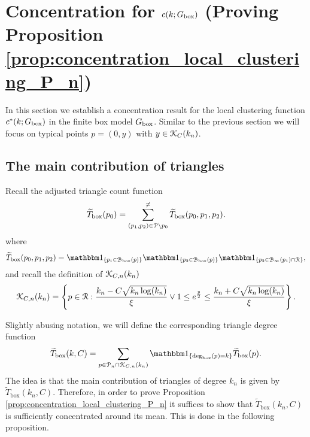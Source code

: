 \section{Concentration for $c(k; G_{\text{box}})$ (Proving Proposition \ref{prop:concentration_local_clustering_P_n})}
\label{sec:concentration_c_P_n}

In this section we establish a concentration result for the local clustering function $c^\ast(k; G_{\text{box}})$ in the finite box model $G_{\text{box}}$. Similar to the previous section we will focus on typical points $p = (0,y)$ with $y \in {\mathcal K}_{C}(k_n)$.

\subsection{The main contribution of triangles}

Recall the adjusted triangle count function
\[
	\widetilde{T}_{\text{box}}(p_0) = \sum_{(p_1, p_2) \in {\mathcal P} \setminus p_0}^{\ne} 
		\widetilde{T}_{\text{box}}(p_0,p_1,p_2).
\]
where
\[
	\widetilde{T}_{\text{box}}(p_0,p_1,p_2) = \ind{p_1 \in \BallPon{p}}\ind{p_2 \in \BallPon{p}}\ind{p_2 \in \BallPo{p_1} \cap \Rcal},
\]
and recall the definition of ${\mathcal K}_{C,n}(k_n)$
\[
	{\mathcal K}_{C,n}(k_n) = \left\{p \in {\mathcal R} : \frac{k_n - C \sqrt{k_n \log(k_n)}}{\xi} \vee 1 \le e^{\frac{y}{2}}
		\le \frac{k_n + C \sqrt{k_n \log(k_n)}}{\xi} \right\}.
\]



Slightly abusing notation, we will define the corresponding triangle degree function
\begin{equation}\label{eq:def_degree_triangle_count_in_K}
	\widetilde{T}_{\text{box}}(k, C) = \sum_{p \in \Pcal_n \cap \Kcal_{C,n}(k_n)} \ind{\text{deg}_{\text{box}}(p) = k} \widetilde{T}_{\text{box}}(p).
\end{equation}
The idea is that the main contribution of triangles of degree $k_n$ is given by $\widetilde{T}_{\text{box}}(k_n, C)$. Therefore, in order to prove Proposition \ref{prop:concentration_local_clustering_P_n} it suffices to show that $\widetilde{T}_{\text{box}}(k_n,C)$ is sufficiently concentrated around its mean. This is done in the following proposition.

%

